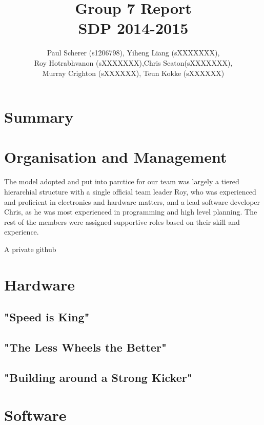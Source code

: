 \documentclass[12pt,a4paper]{article}
\begin{document}
\title{Group 7 Report\\
		SDP 2014-2015}
\author{Paul Scherer (s1206798), Yiheng Liang (sXXXXXXX),\\ Roy Hotrabhvanon (sXXXXXXX),Chris Seaton(sXXXXXXX),\\ Murray Crighton (sXXXXXX), Teun Kokke (sXXXXXX)}
\maketitle

\section{Summary}


\section{Organisation and Management}
The model adopted and put into parctice for our team was largely a tiered hierarchial structure with a single official team leader Roy, who was experienced and proficient in electronics and hardware matters, and a lead software developer Chris, as he was most experienced in programming and high level planning. The rest of the members were assigned supportive roles based on their skill and experience. 

A private github

\section{Hardware}
\subsection{"Speed is King"}
\subsection{"The Less Wheels the Better"}
\subsection{"Building around a Strong Kicker"}


\section{Software}
\end{document}
